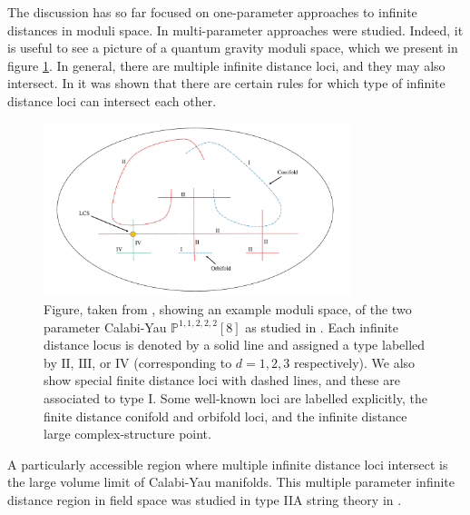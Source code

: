 \documentclass[11pt,a4paper]{article}
\numberwithin{equation}{section}
\numberwithin{table}{section}\setlength{\multlinegap}{25pt}
\begin{document}
{The discussion has so far focused on one-parameter approaches to infinite distances in moduli space. In \cite{Grimm:2018cpv} multi-parameter approaches were studied. Indeed, it is useful to see a picture of a quantum gravity moduli space, which we present in figure \ref{fig:modCY}. In general, there are multiple infinite distance loci, and they may also intersect. In \cite{Grimm:2018cpv} it was shown that there are certain rules for which type of infinite distance loci can intersect each other. 
\begin{figure}[t]
\centering
 \includegraphics[width=0.8\textwidth]{modCY.pdf}
\caption{Figure, taken from \cite{Grimm:2018cpv}, showing an example moduli space, of the two parameter Calabi-Yau $\mathbb{P}^{1,1,2,2,2}[8]$ as studied in \cite{Candelas:1993dm}. Each infinite distance locus is denoted by a solid line and assigned a type labelled by $\mathrm{II}$, $\mathrm{III}$, or $\mathrm{IV}$ (corresponding to $d=1,2,3$ respectively). We also show special finite distance loci with dashed lines, and these are associated to type I. Some well-known loci are labelled explicitly, the finite distance conifold and orbifold loci, and the infinite distance large complex-structure point.}
\label{fig:modCY}
\end{figure}
A particularly accessible region where multiple infinite distance loci intersect is the large volume limit of Calabi-Yau manifolds. This multiple parameter infinite distance region in field space was studied in type IIA string theory in \cite{Corvilain:2018lgw}.

}
\end{document}

